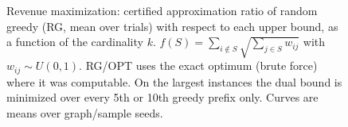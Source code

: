 \begin{figure}[t]
\centering
\setlength{\rgplotwidth}{0.49\columnwidth}
\\[1pt]
\hfill
\\
\hfill

\caption{Revenue maximization: certified approximation ratio of random greedy (RG, mean over trials) with respect to each upper bound, as a function of the cardinality $k$. $f(S)=\sum_{i\notin S}\sqrt{\sum_{j\in S} w_{ij}}$ with $w_{ij}\sim U(0,1)$. RG/OPT uses the exact optimum (brute force) where it was computable. On the largest instances the dual bound is minimized over every 5th or 10th greedy prefix only. Curves are means over graph/sample seeds.}
\label{fig:rg-revenue_max}
\end{figure}
